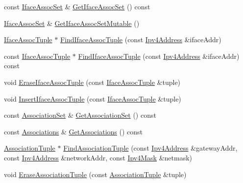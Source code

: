 \begin{DoxyCompactItemize}
\item 
const \hyperlink{namespacens3_1_1olsr_af7456b9ea2cde8c7d88443de06c015f4}{Iface\+Assoc\+Set} \& \hyperlink{classns3_1_1olsr_1_1OlsrState_ae2958cc39b5a1e154797ad2efe462cfb}{Get\+Iface\+Assoc\+Set} () const 
\item 
\hyperlink{namespacens3_1_1olsr_af7456b9ea2cde8c7d88443de06c015f4}{Iface\+Assoc\+Set} \& \hyperlink{classns3_1_1olsr_1_1OlsrState_aff6a1f0bac684ac28ea0bed037cc7ef2}{Get\+Iface\+Assoc\+Set\+Mutable} ()
\item 
\hyperlink{structns3_1_1olsr_1_1IfaceAssocTuple}{Iface\+Assoc\+Tuple} $\ast$ \hyperlink{classns3_1_1olsr_1_1OlsrState_a35a68caeae507605f294290967216d50}{Find\+Iface\+Assoc\+Tuple} (const \hyperlink{classns3_1_1Ipv4Address}{Ipv4\+Address} \&iface\+Addr)
\item 
const \hyperlink{structns3_1_1olsr_1_1IfaceAssocTuple}{Iface\+Assoc\+Tuple} $\ast$ \hyperlink{classns3_1_1olsr_1_1OlsrState_aa692c130a07f26c47bf3dc12f95a5aec}{Find\+Iface\+Assoc\+Tuple} (const \hyperlink{classns3_1_1Ipv4Address}{Ipv4\+Address} \&iface\+Addr) const 
\item 
void \hyperlink{classns3_1_1olsr_1_1OlsrState_a16dc218c6ffe6aed37c5ddfb9d941970}{Erase\+Iface\+Assoc\+Tuple} (const \hyperlink{structns3_1_1olsr_1_1IfaceAssocTuple}{Iface\+Assoc\+Tuple} \&tuple)
\item 
void \hyperlink{classns3_1_1olsr_1_1OlsrState_adfa9fad0b607bb12e917b4498d1f4547}{Insert\+Iface\+Assoc\+Tuple} (const \hyperlink{structns3_1_1olsr_1_1IfaceAssocTuple}{Iface\+Assoc\+Tuple} \&tuple)
\item 
const \hyperlink{namespacens3_1_1olsr_a35c0d7e5a941dd49e212f0c9e81ba466}{Association\+Set} \& \hyperlink{classns3_1_1olsr_1_1OlsrState_acfc3b69f5b2a730cfe5501f757ec7c80}{Get\+Association\+Set} () const 
\item 
const \hyperlink{namespacens3_1_1olsr_a7aefab4ffae5b289262125647510a2ef}{Associations} \& \hyperlink{classns3_1_1olsr_1_1OlsrState_af0d7450ccc6238bb018e8f22fcaf0552}{Get\+Associations} () const 
\item 
\hyperlink{structns3_1_1olsr_1_1AssociationTuple}{Association\+Tuple} $\ast$ \hyperlink{classns3_1_1olsr_1_1OlsrState_aa399ca44ad27907342350710d1904b84}{Find\+Association\+Tuple} (const \hyperlink{classns3_1_1Ipv4Address}{Ipv4\+Address} \&gateway\+Addr, const \hyperlink{classns3_1_1Ipv4Address}{Ipv4\+Address} \&network\+Addr, const \hyperlink{classns3_1_1Ipv4Mask}{Ipv4\+Mask} \&netmask)
\item 
void \hyperlink{classns3_1_1olsr_1_1OlsrState_a91bb7f6b82946760281081ee3f53f13c}{Erase\+Association\+Tuple} (const \hyperlink{structns3_1_1olsr_1_1AssociationTuple}{Association\+Tuple} \&tuple)

\end{DoxyCompactItemize}

